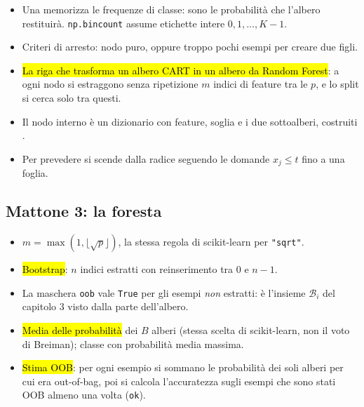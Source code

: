 \begin{tecnica}[Spiegazione]
\begin{itemize}
  \item {} Una  memorizza le frequenze di classe: sono le probabilità che l'albero restituirà. \texttt{np.bincount} assume etichette intere $0,1,\dots,K-1$.
  \item {} Criteri di arresto: nodo puro, oppure troppo pochi esempi per creare due figli.
  \item {} \hl{La riga che trasforma un albero CART in un albero da Random Forest}: a ogni nodo si estraggono senza ripetizione $m$ indici di feature tra le $p$, e lo split si cerca solo tra questi.
  \item {} Il nodo interno è un dizionario con feature, soglia e i due sottoalberi, costruiti .
  \item {} Per prevedere si scende dalla radice seguendo le domande $x_j\le t$ fino a una foglia.
\end{itemize}
\end{tecnica}

\subsection{Mattone 3: la foresta}


\begin{tecnica}[Spiegazione]
\begin{itemize}
  \item {} $m=\max(1,\lfloor\sqrt p\rfloor)$, la stessa regola di scikit-learn per \texttt{"sqrt"}.
  \item {} \hl{Bootstrap}: $n$ indici estratti con reinserimento tra $0$ e $n-1$.
  \item {} La maschera \texttt{oob} vale \texttt{True} per gli esempi \emph{non} estratti: è l'insieme $\mathcal{B}_i$ del capitolo 3 visto dalla parte dell'albero.
  \item {} \hl{Media delle probabilità} dei $B$ alberi (stessa scelta di scikit-learn, non il voto di Breiman);  classe con probabilità media massima.
  \item {} \hl{Stima OOB}: per ogni esempio si sommano le probabilità dei soli alberi per cui era out-of-bag, poi si calcola l'accuratezza sugli esempi che sono stati OOB almeno una volta (\texttt{ok}).
\end{itemize}
\end{tecnica}

